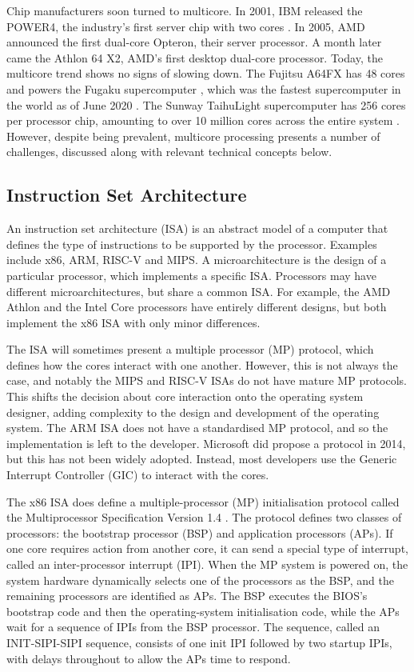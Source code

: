 \documentclass[bsc,frontabs,singlespacing,parskip,deptreport]{infthesis}
\begin{document}
Chip manufacturers soon turned to multicore. In 2001, IBM released the POWER4, the industry’s first server chip with two cores \cite{power4}. In 2005, AMD announced the first dual-core Opteron, their server processor. A month later came the Athlon 64 X2, AMD’s first desktop dual-core processor. Today, the multicore trend shows no signs of slowing down. The Fujitsu A64FX has 48 cores and powers the Fugaku supercomputer \cite{a64fx}, which was the fastest supercomputer in the world as of June 2020 \cite{top500}. The Sunway TaihuLight supercomputer has 256 cores per processor chip, amounting to over 10 million cores across the entire system \cite{sunway}. However, despite being prevalent, multicore processing presents a number of challenges, discussed along with relevant technical concepts below.

\subsection{Instruction Set Architecture} \label{architectural-challenges}
An instruction set architecture (ISA) is an abstract model of a computer that defines the type of instructions to be supported by the processor. Examples include x86, ARM, RISC-V and MIPS. A microarchitecture is the design of a particular processor, which implements a specific ISA. Processors may have different microarchitectures, but share a common ISA. For example, the AMD Athlon and the Intel Core processors have entirely different designs, but both implement the x86 ISA with only minor differences.

The ISA will sometimes present a multiple processor (MP) protocol, which defines how the cores interact with one another. However, this is not always the case, and notably the MIPS and RISC-V ISAs do not have mature MP protocols. This shifts the decision about core interaction onto the operating system designer, adding complexity to the design and development of the operating system. The ARM ISA does not have a standardised MP protocol, and so the implementation is left to the developer. Microsoft did propose a protocol in 2014, but this has not been widely adopted. Instead, most developers use the Generic Interrupt Controller (GIC) to interact with the cores.

The x86 ISA does define a multiple-processor (MP) initialisation protocol called the Multiprocessor Specification Version 1.4 \cite{intel-sys-prog-guide}. The protocol defines two classes of processors: the bootstrap processor (BSP) and application processors (APs). If one core requires action from another core, it can send a special type of interrupt, called an inter-processor interrupt (IPI). When the MP system is powered on, the system hardware dynamically selects one of the processors as the BSP, and the remaining processors are identified as APs. The BSP executes the BIOS’s bootstrap code and then the operating-system initialisation code, while the APs wait for a sequence of IPIs from the BSP processor. The sequence, called an INIT-SIPI-SIPI sequence, consists of one init IPI followed by two startup IPIs, with delays throughout to allow the APs time to respond.
\end{document}
